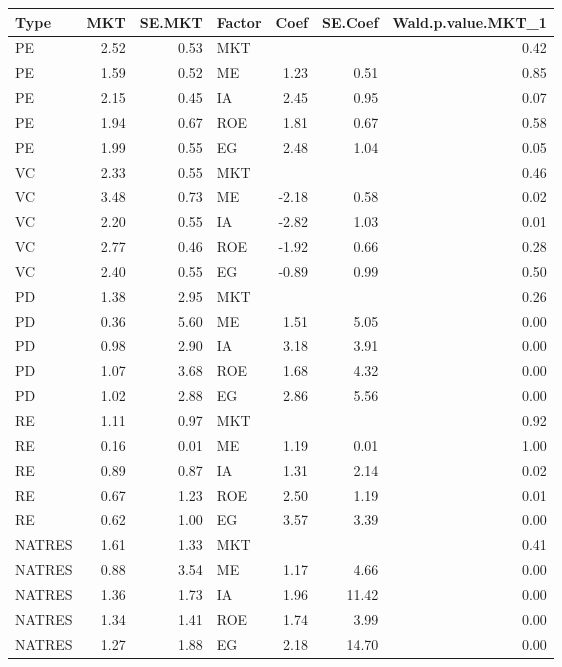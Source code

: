 \documentclass[12pt]{article}
\begin{document}
\begin{table}[ht]
	\centering
	\begin{tabular}{lrrlrrr}
		Type & MKT & SE.MKT & Factor & Coef & SE.Coef & Wald.p.value.MKT\_1 \\ 
		\hline
		\hline
		PE & 2.52 & 0.53 & MKT &  &  & 0.42 \\ 
		PE & 1.59 & 0.52 & ME & 1.23 & 0.51 & 0.85 \\ 
		PE & 2.15 & 0.45 & IA & 2.45 & 0.95 & 0.07 \\ 
		PE & 1.94 & 0.67 & ROE & 1.81 & 0.67 & 0.58 \\ 
		PE & 1.99 & 0.55 & EG & 2.48 & 1.04 & 0.05 \\ 
		\hline
		VC & 2.33 & 0.55 & MKT &  &  & 0.46 \\ 
		VC & 3.48 & 0.73 & ME & -2.18 & 0.58 & 0.02 \\ 
		VC & 2.20 & 0.55 & IA & -2.82 & 1.03 & 0.01 \\ 
		VC & 2.77 & 0.46 & ROE & -1.92 & 0.66 & 0.28 \\ 
		VC & 2.40 & 0.55 & EG & -0.89 & 0.99 & 0.50 \\ 
		\hline
		PD & 1.38 & 2.95 & MKT &  &  & 0.26 \\ 
		PD & 0.36 & 5.60 & ME & 1.51 & 5.05 & 0.00 \\ 
		PD & 0.98 & 2.90 & IA & 3.18 & 3.91 & 0.00 \\ 
		PD & 1.07 & 3.68 & ROE & 1.68 & 4.32 & 0.00 \\ 
		PD & 1.02 & 2.88 & EG & 2.86 & 5.56 & 0.00 \\ 
		\hline
		RE & 1.11 & 0.97 & MKT &  &  & 0.92 \\ 
		RE & 0.16 & 0.01 & ME & 1.19 & 0.01 & 1.00 \\ 
		RE & 0.89 & 0.87 & IA & 1.31 & 2.14 & 0.02 \\ 
		RE & 0.67 & 1.23 & ROE & 2.50 & 1.19 & 0.01 \\ 
		RE & 0.62 & 1.00 & EG & 3.57 & 3.39 & 0.00 \\ 
		\hline
		NATRES & 1.61 & 1.33 & MKT &  &  & 0.41 \\ 
		NATRES & 0.88 & 3.54 & ME & 1.17 & 4.66 & 0.00 \\ 
		NATRES & 1.36 & 1.73 & IA & 1.96 & 11.42 & 0.00 \\ 
		NATRES & 1.34 & 1.41 & ROE & 1.74 & 3.99 & 0.00 \\ 
		NATRES & 1.27 & 1.88 & EG & 2.18 & 14.70 & 0.00 \\ 

\end{tabular}
\end{table}
\end{document}
